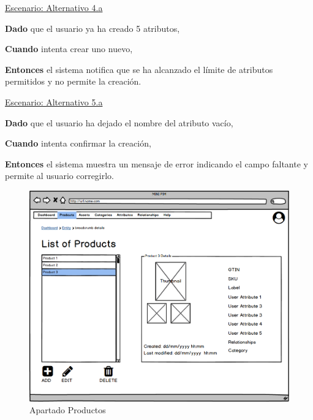 \underline{Escenario: Alternativo 4.a}\par
\vspace{0.15cm}
\textbf{Dado} que el usuario ya ha creado 5 atributos,\par
\textbf{Cuando} intenta crear uno nuevo,\par
\textbf{Entonces} el sistema notifica que se ha alcanzado el límite de atributos permitidos y no permite la creación.\par
\vspace{0.20cm}

\underline{Escenario: Alternativo 5.a}\par
\vspace{0.15cm}
\textbf{Dado} que el usuario ha dejado el nombre del atributo vacío,\par
\textbf{Cuando} intenta confirmar la creación,\par
\textbf{Entonces} el sistema muestra un mensaje de error indicando el campo faltante y permite al usuario corregirlo.\par
\vspace{0.20cm}


\begin{figure}[H]
    \includegraphics[width=1\linewidth]{mockups/RF2.1_boceto1.png}
    \caption{Apartado Productos}
   \end{figure}
\vspace{1.0cm}

